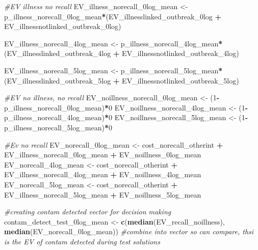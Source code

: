 \documentclass[
]{article}
\newenvironment{Shaded}{\begin{snugshade}}{\end{snugshade}}
\newcommand{\CommentTok}[1]{\textcolor[rgb]{0.56,0.35,0.01}{\textit{#1}}}
\newcommand{\DecValTok}[1]{\textcolor[rgb]{0.00,0.00,0.81}{#1}}
\newcommand{\FunctionTok}[1]{\textcolor[rgb]{0.13,0.29,0.53}{\textbf{#1}}}
\newcommand{\NormalTok}[1]{#1}
\newcommand{\OtherTok}[1]{\textcolor[rgb]{0.56,0.35,0.01}{#1}}
\newcommand{\SpecialCharTok}[1]{\textcolor[rgb]{0.81,0.36,0.00}{\textbf{#1}}}
\begin{document}
\begin{Shaded}
\begin{Highlighting}[]
\CommentTok{\#EV illness no recall}
\NormalTok{EV\_illness\_norecall\_0log\_mean }\OtherTok{\textless{}{-}}\NormalTok{ p\_illness\_norecall\_0log\_mean}\SpecialCharTok{*}\NormalTok{(EV\_illnesslinked\_outbreak\_0log }\SpecialCharTok{+}\NormalTok{ EV\_illnessnotlinked\_outbreak\_0log)}

\NormalTok{EV\_illness\_norecall\_4log\_mean }\OtherTok{\textless{}{-}}\NormalTok{ p\_illness\_norecall\_4log\_mean}\SpecialCharTok{*}\NormalTok{(EV\_illnesslinked\_outbreak\_4log }\SpecialCharTok{+}\NormalTok{ EV\_illnessnotlinked\_outbreak\_4log)}

\NormalTok{EV\_illness\_norecall\_5log\_mean }\OtherTok{\textless{}{-}}\NormalTok{ p\_illness\_norecall\_5log\_mean}\SpecialCharTok{*}\NormalTok{(EV\_illnesslinked\_outbreak\_5log }\SpecialCharTok{+}\NormalTok{ EV\_illnessnotlinked\_outbreak\_5log)}


\CommentTok{\#EV no illness, no recall}
\NormalTok{EV\_noillness\_norecall\_0log\_mean }\OtherTok{\textless{}{-}}\NormalTok{ (}\DecValTok{1}\SpecialCharTok{{-}}\NormalTok{ p\_illness\_norecall\_0log\_mean)}\SpecialCharTok{*}\DecValTok{0}
\NormalTok{EV\_noillness\_norecall\_4log\_mean }\OtherTok{\textless{}{-}}\NormalTok{ (}\DecValTok{1}\SpecialCharTok{{-}}\NormalTok{ p\_illness\_norecall\_4log\_mean)}\SpecialCharTok{*}\DecValTok{0}
\NormalTok{EV\_noillness\_norecall\_5log\_mean }\OtherTok{\textless{}{-}}\NormalTok{ (}\DecValTok{1}\SpecialCharTok{{-}}\NormalTok{ p\_illness\_norecall\_5log\_mean)}\SpecialCharTok{*}\DecValTok{0}


\CommentTok{\#Ev no recall}
\NormalTok{EV\_norecall\_0log\_mean }\OtherTok{\textless{}{-}}\NormalTok{ cost\_norecall\_otherint }\SpecialCharTok{+}\NormalTok{ EV\_illness\_norecall\_0log\_mean }\SpecialCharTok{+}\NormalTok{ EV\_noillness\_0log\_mean}
\NormalTok{EV\_norecall\_4log\_mean }\OtherTok{\textless{}{-}}\NormalTok{ cost\_norecall\_otherint }\SpecialCharTok{+}\NormalTok{ EV\_illness\_norecall\_4log\_mean }\SpecialCharTok{+}\NormalTok{ EV\_noillness\_4log\_mean}
\NormalTok{EV\_norecall\_5log\_mean }\OtherTok{\textless{}{-}}\NormalTok{ cost\_norecall\_otherint }\SpecialCharTok{+}\NormalTok{ EV\_illness\_norecall\_5log\_mean }\SpecialCharTok{+}\NormalTok{ EV\_noillness\_5log\_mean}


\CommentTok{\#creating contam detected vector for decision making}
\NormalTok{contam\_detect\_test\_0log\_mean }\OtherTok{\textless{}{-}} \FunctionTok{c}\NormalTok{(}\FunctionTok{median}\NormalTok{(EV\_recall\_noillness), }\FunctionTok{median}\NormalTok{(EV\_norecall\_0log\_mean)) }\CommentTok{\#combine into vector so can compare, thsi is the EV of contam detected during test solutions}


\end{Highlighting}
\end{Shaded}
\end{document}
